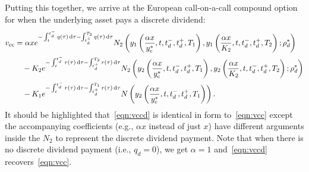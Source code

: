 Putting this together, we arrive at the European call-on-a-call compound option for when the underlying asset pays a discrete dividend:
	\begin{equation}
	\label{eqn:vccd}
	\begin{split}
		v_\text{cc} &= \alpha xe^{-\int_t^{t_d^-} q(\tau) \, \mathrm d\tau - \int_{t_d^+}^{T_2} q(\tau)\,\mathrm d\tau}N_2\left( y_1\left( \frac{\alpha x}{y_\text{c}^*}, t, t_d^-, t_d^+, T_1 \right), y_1\left( \frac{\alpha x}{K_2}, t, t_d^-, t_d^+, T_2 \right); \rho_d^* \right) \\
		& \quad -K_2e^{-\int_t^{t_d^-} r(\tau) \, \mathrm d\tau - \int_{t_d^+}^{T_2} r(\tau)\,\mathrm d\tau}N_2\left( y_2\left( \frac{\alpha x}{y_\text{c}^*}, t, t_d^-, t_d^+, T_1 \right), y_2\left( \frac{\alpha x}{K_2}, t, t_d^-, t_d^+, T_2 \right); \rho_d^* \right) \\
		& \quad -K_1e^{-\int_t^{t_d^-} r(\tau) \, \mathrm d\tau - \int_{t_d^+}^{T_1} r(\tau)\,\mathrm d\tau}N\left( y_2\left( \frac{\alpha x}{y_\text{c}^*}, t, t_d^-, t_d^+, T_1 \right) \right).
	\end{split}
	\end{equation}
It should be highlighted that~\eqref{eqn:vccd} is identical in form to~\eqref{eqn:vcc} except the accompanying coefficients (e.g., $\alpha x$ instead of just $x$) have different arguments inside the $N_2$ to represent the discrete dividend payment. Note that when there is no discrete dividend payment (i.e., $q_d = 0$), we get $\alpha = 1$ and~\eqref{eqn:vccd} recovers~\eqref{eqn:vcc}.

	



